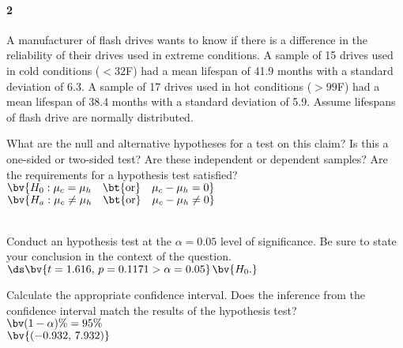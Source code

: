 \documentclass{article}
\begin{document}
\begin{flushleft}
\paragraph{2} A manufacturer of flash drives wants to know if there is a difference in the reliability of their drives used in extreme conditions. A sample of 15 drives used in cold conditions ($< 32 $\textdegree F) had a mean lifespan of 41.9 months with a standard deviation of 6.3. A sample of 17 drives used in hot conditions ($> 99 $\textdegree F) had a mean lifespan of 38.4 months with a standard deviation of 5.9. Assume lifespans of flash drive are normally distributed.
\begin{enumalpha}
\item What are the null and alternative hypotheses for a test on this claim? Is this a one-sided or two-sided test? Are these independent or dependent samples? Are the requirements for a hypothesis test satisfied?\\
\medskip
$\bv{H_0: \mu_c = \mu_h \quad \text{\bt{or}} \quad \mu_c - \mu_h = 0}$ \\
$\bv{H_a: \mu_c \ne \mu_h \quad \text{\bt{or}} \quad \mu_c - \mu_h \ne 0}$ \\
\\
\vspace{1in}

\item Conduct an hypothesis test at the $\alpha = 0.05$ level of significance. Be sure to state your conclusion in the context of the question.\\
\medskip
$\ds\bv{t = 1.616, \,p = 0.1171 > \alpha =0.05}$$\bv{H_0.}$\\
\vspace{1in}

\item Calculate the appropriate confidence interval. Does the inference from the confidence interval match the results of the hypothesis test?\\
\medskip
{}$\bv{(1-\alpha)\% = 95\%}$\\
$\bv{(-0.932, \, 7.932)}$\\


\end{enumalpha}
\end{flushleft}
\end{document}
